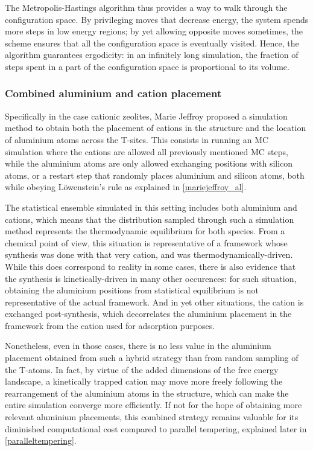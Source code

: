 \documentclass[main.tex]{subfiles}
\begin{document}
The Metropolis-Hastings algorithm thus provides a way to walk through the configuration space. By privileging moves that decrease energy, the system spends more steps in low energy regions; by yet allowing opposite moves sometimes, the scheme ensures that all the configuration space is eventually visited. Hence, the algorithm guarantees ergodicity: in an infinitely long simulation, the fraction of steps spent in a part of the configuration space is proportional to its volume. %


\subsubsection{Combined aluminium and cation placement} %

Specifically in the case cationic zeolites, Marie Jeffroy \cite{Jeffroy} proposed a simulation method to obtain both the placement of cations in the structure and the location of aluminium atoms across the T-sites. This consists in running an MC simulation where the cations are allowed all previously mentioned MC steps, while the aluminium atoms are only allowed exchanging positions with silicon atoms, or a restart step that randomly places aluminium and silicon atoms, both while obeying L\"owenstein's rule as explained in \cref{mariejeffroy_al}.

The statistical ensemble simulated in this setting includes both aluminium and cations, which means that the distribution sampled through such a simulation method represents the thermodynamic equilibrium for both species. From a chemical point of view, this situation is representative of a framework whose synthesis was done with that very cation, and was thermodynamically-driven. While this does correspond to reality in some cases, there is also evidence that the synthesis is kinetically-driven in many other occurences: for such situation, obtaining the aluminium positions from statistical equilibrium is not representative of the actual framework. And in yet other situations, the cation is exchanged post-synthesis, which decorrelates the aluminium placement in the framework from the cation used for adsorption purposes.

Nonetheless, even in those cases, there is no less value in the aluminium placement obtained from such a hybrid strategy than from random sampling of the T-atoms. In fact, by virtue of the added dimensions of the free energy landscape, a kinetically trapped cation may move more freely following the rearrangement of the aluminium atoms in the structure, which can make the entire simulation converge more efficiently. If not for the hope of obtaining more relevant aluminium placements, this combined strategy remains valuable for its diminished computational cost compared to parallel tempering, explained later in \cref{paralleltempering}.
\end{document}
